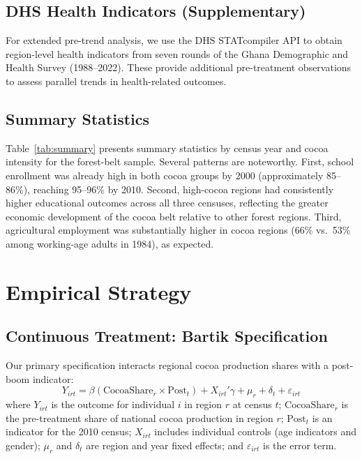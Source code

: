 \documentclass[12pt]{article}
\begin{document}
\subsection{DHS Health Indicators (Supplementary)}

For extended pre-trend analysis, we use the DHS STATcompiler API to obtain region-level health indicators from seven rounds of the Ghana Demographic and Health Survey (1988--2022). These provide additional pre-treatment observations to assess parallel trends in health-related outcomes.

\subsection{Summary Statistics}



Table~\ref{tab:summary} presents summary statistics by census year and cocoa intensity for the forest-belt sample. Several patterns are noteworthy. First, school enrollment was already high in both cocoa groups by 2000 (approximately 85--86\%), reaching 95--96\% by 2010. Second, high-cocoa regions had consistently higher educational outcomes across all three censuses, reflecting the greater economic development of the cocoa belt relative to other forest regions. Third, agricultural employment was substantially higher in cocoa regions (66\% vs.\ 53\% among working-age adults in 1984), as expected.


\section{Empirical Strategy}
\label{sec:strategy}

\subsection{Continuous Treatment: Bartik Specification}

Our primary specification interacts regional cocoa production shares with a post-boom indicator:
\begin{equation}
Y_{irt} = \beta (\text{CocoaShare}_r \times \text{Post}_t) + X_{irt}'\gamma + \mu_r + \delta_t + \varepsilon_{irt}
\label{eq:bartik}
\end{equation}
where $Y_{irt}$ is the outcome for individual $i$ in region $r$ at census $t$; $\text{CocoaShare}_r$ is the pre-treatment share of national cocoa production in region $r$; $\text{Post}_t$ is an indicator for the 2010 census; $X_{irt}$ includes individual controls (age indicators and gender); $\mu_r$ and $\delta_t$ are region and year fixed effects; and $\varepsilon_{irt}$ is the error term.
\end{document}
